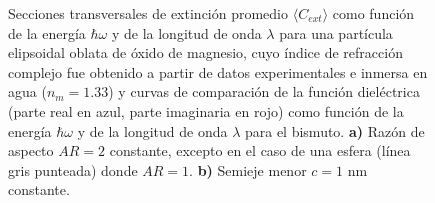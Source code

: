 \begin{figure}[H]
	\quad%
	\caption{Secciones transversales de extinción promedio $\langle C_{ext}\rangle$ como función de la energía $\hbar\omega$ y de la longitud de onda $\lambda$ para una partícula elipsoidal oblata de óxido de magnesio, cuyo índice de refracción complejo fue obtenido a partir de datos experimentales  e inmersa en agua ($n_m=1.33$) y curvas de comparación de la función dieléctrica (parte real en azul, parte imaginaria en rojo) como función de la energía $\hbar\omega$ y de la longitud de onda $\lambda$ para el bismuto. \textbf{a)} Razón de aspecto $AR=2$ constante, excepto en el caso de una esfera (línea gris punteada) donde $AR=1$. \textbf{b)} Semieje menor $c=1$ nm constante.}\label{mgo}
\end{figure}






